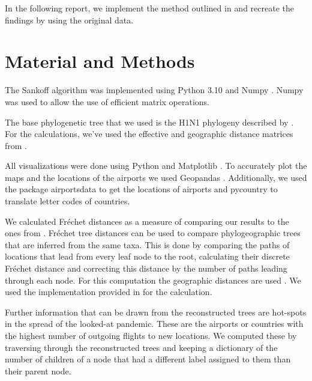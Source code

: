 \documentclass{article}
\begin{document}
In the following report, we implement the method outlined in
\cite{reimeringPhylogeographicReconstructionUsing2020} and recreate the findings
by using the original data.

\section{Material and Methods}
The Sankoff algorithm was implemented using Python 3.10
\cite{pythonsoftwarefoundationWelcomePythonOrg2023} and Numpy \cite{harrisArrayProgrammingNumPy2020}. Numpy was used to allow the use of
efficient matrix operations.

The base phylogenetic tree that we used is the H1N1 phylogeny described by
\cite{reimeringPhylogeographicReconstructionUsing2020}. For the calculations,
we've used the effective and geographic distance matrices from
\cite{reimeringDistanceMatricesParsimonious2019}. 

All visualizations were done using Python and Matplotlib \cite{MatplotlibVisualizationPython}. To accurately plot the maps and the locations of the
airports we used Geopandas \cite{GeoPandas12GeoPandas}. Additionally, we used the package airportsdata \cite{borsettiAirportsdataExtensiveDatabase2022} to get the locations of
airports and pycountry \cite{theunePycountryISOCountry} to translate letter codes
of countries.

We calculated Fr\'{e}chet distances as a measure of comparing our results to the ones from \cite{reimeringPhylogeographicReconstructionUsing2020}. Fr\'{e}chet tree distances can be used to compare phylogeographic trees that are inferred from the same taxa. This is done by comparing the paths of locations that lead from every leaf node to the root, calculating their discrete Fr\'{e}chet distance and correcting this distance by the number of paths leading through each node. For this computation the geographic distances are used \cite{reimeringFrechetTreeDistance2018}. We used the implementation provided in \cite{reimeringFrechetTreeDistance2018} for the calculation.

Further information that can be drawn from the reconstructed trees are hot-spots in the spread of the looked-at pandemic. These are the airports or countries with the highest number of outgoing flights to new locations. We computed these by traversing through the reconstructed trees and keeping a dictionary of the number of children of a node that had a different label assigned to them than their parent node.
\end{document}
